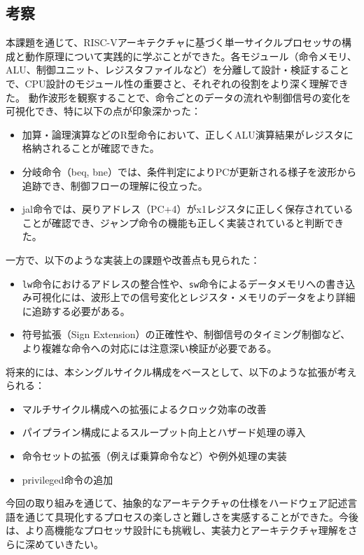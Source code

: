 \documentclass[a4paper, 11pt]{article}
\begin{document}
\subsection{考察}
本課題を通じて、RISC-Vアーキテクチャに基づく単一サイクルプロセッサの構成と動作原理について実践的に学ぶことができた。各モジュール（命令メモリ、ALU、制御ユニット、レジスタファイルなど）を分離して設計・検証することで、CPU設計のモジュール性の重要さと、それぞれの役割をより深く理解できた。
動作波形を観察することで、命令ごとのデータの流れや制御信号の変化を可視化でき、特に以下の点が印象深かった：
\begin{itemize}
\item 加算・論理演算などのR型命令において、正しくALU演算結果がレジスタに格納されることが確認できた。
\item 分岐命令（beq, bne）では、条件判定によりPCが更新される様子を波形から追跡でき、制御フローの理解に役立った。
\item jal命令では、戻りアドレス（PC+4）がx1レジスタに正しく保存されていることが確認でき、ジャンプ命令の機能も正しく実装されていると判断できた。
\end{itemize}
一方で、以下のような実装上の課題や改善点も見られた：
\begin{itemize}
\item \texttt{lw}命令におけるアドレスの整合性や、\texttt{sw}命令によるデータメモリへの書き込み可視化には、波形上での信号変化とレジスタ・メモリのデータをより詳細に追跡する必要がある。
\item 符号拡張（Sign Extension）の正確性や、制御信号のタイミング制御など、より複雑な命令への対応には注意深い検証が必要である。
\end{itemize}
将来的には、本シングルサイクル構成をベースとして、以下のような拡張が考えられる：
\begin{itemize}
\item マルチサイクル構成への拡張によるクロック効率の改善
\item パイプライン構成によるスループット向上とハザード処理の導入
\item 命令セットの拡張（例えば乗算命令など）や例外処理の実装
\item privileged命令の追加
\end{itemize}
今回の取り組みを通じて、抽象的なアーキテクチャの仕様をハードウェア記述言語を通じて具現化するプロセスの楽しさと難しさを実感することができた。今後は、より高機能なプロセッサ設計にも挑戦し、実装力とアーキテクチャ理解をさらに深めていきたい。
\end{document}
